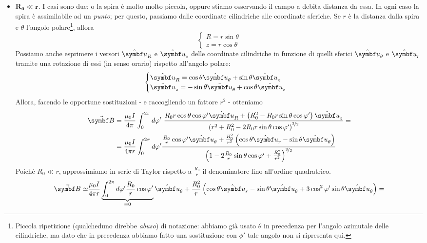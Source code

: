 \begin{itemize}
	\item $\mathbf{R_0\ll r.}$ I casi sono due: o la spira è molto molto piccola, oppure stiamo osservando il campo a debita distanza da essa. In ogni caso la spira è assimilabile ad un \textit{punto}; per questo, passiamo dalle coordinate cilindriche alle coordinate sferiche. Se $r$ è la distanza dalla spira e $\theta$ l'angolo polare\footnote{Piccola ripetizione (qualcheduno direbbe \textit{abuso}) di notazione: abbiamo già usato $\theta$ in precedenza per l'angolo azimutale delle cilindriche, ma dato che in precedenza abbiamo fatto una sostituzione con $\phi'$ tale angolo non si ripresenta qui.}, allora 
	\begin{equation*}
		\begin{cases}
			R=r\sin\theta\\
			z=r\cos\theta
		\end{cases}
	\end{equation*}
	Possiamo anche esprimere i versori $\vbh{u}_R$ e $\vbh{u}_z$ delle coordinate cilindriche in funzione di quelli sferici $\vbh{u}_{\theta}$ e $\vbh{u}_r$ tramite una rotazione di essi (in senso orario) rispetto all'angolo polare:
	\begin{equation*}
		\begin{cases}
			\vbh{u}_R=\cos\theta\vbh{u}_{\theta}+\sin\theta\vbh{u}_{z}\\
			\vbh{u}_z=-\sin\theta\vbh{u}_{\theta}+\cos\theta\vbh{u}_{z}
		\end{cases}
	\end{equation*}
	Allora, facendo le opportune sostituzioni - e raccogliendo un fattore $r^2$ - otteniamo
	\begin{align*}
		\vba{B}&=\frac{\mu_0 I}{4\pi }\int_0^{2\pi}d\phi'\ \frac{R_0r\cos\theta\cos\phi'\vbh{u}_R+\left(R_0^2-R_0r\sin\theta\cos\phi'\right)\vbh{u}_z}{\left(r^2+R_0^2-2R_0r\sin\theta\cos\phi'\right)^{\nicefrac{3}{2}}}=\\
		&=\frac{\mu_0 I}{4\pi r}\int_0^{2\pi}d\phi'\frac{\frac{R_0}{r}\cos\phi'\vbh{u}_{\theta}+\frac{R_0^2}{r^2}\left(\cos\theta\vbh{u}_r-\sin\theta\vbh{u}_\theta\right)}{\left(1-2\frac{R_0}{r}\sin\theta\cos\phi'+\frac{R_0^2}{r^2}\right)^{\nicefrac{3}{2}}}
	\end{align*}
	Poiché $R_0\ll r$, approssimiamo in serie di Taylor rispetto a $\frac{R_0}{r}$ il denominatore fino all'ordine quadratrico.
	\begin{align*}
		\vba{B}\simeq&\frac{\mu_0 I}{4\pi r}\underbrace{\int_0^{2\pi}d\phi'\frac{R_0}{r}\cos\phi'}_{=0}\vbh{u}_{\theta}+\frac{R_0^2}{r}\left(\cos\theta\vbh{u}_r-\sin\theta\vbh{u}_\theta+3\cos^2\phi'\sin\theta\vbh{u}_\theta\right)=\\

\end{align*}
\end{itemize}
